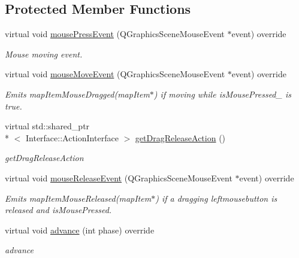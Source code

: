 \subsection*{Protected Member Functions}
\begin{DoxyCompactItemize}
\item 
virtual void \hyperlink{classmap_item_a6525f50a331be9b573c5f41bc7ecad60}{mouse\-Press\-Event} (Q\-Graphics\-Scene\-Mouse\-Event $\ast$event) override
\begin{DoxyCompactList}\small\item\em Mouse moving event. \end{DoxyCompactList}\item 
virtual void \hyperlink{classmap_item_aaa14fe9b384115c559b99086d46860fc}{mouse\-Move\-Event} (Q\-Graphics\-Scene\-Mouse\-Event $\ast$event) override
\begin{DoxyCompactList}\small\item\em Emits map\-Item\-Mouse\-Dragged(map\-Item$\ast$) if moving while is\-Mouse\-Pressed\-\_\- is true. \end{DoxyCompactList}\item 
virtual std\-::shared\-\_\-ptr\\*
$<$ Interface\-::\-Action\-Interface $>$ \hyperlink{classmap_item_ad67b22927103d57c1dc4136eb9115771}{get\-Drag\-Release\-Action} ()
\begin{DoxyCompactList}\small\item\em get\-Drag\-Release\-Action \end{DoxyCompactList}\item 
virtual void \hyperlink{classmap_item_a5a056109cc0e26053c33d4f639c9ce73}{mouse\-Release\-Event} (Q\-Graphics\-Scene\-Mouse\-Event $\ast$event) override
\begin{DoxyCompactList}\small\item\em Emits map\-Item\-Mouse\-Released(map\-Item$\ast$) if a dragging leftmousebutton is released and is\-Mouse\-Pressed. \end{DoxyCompactList}\item 
virtual void \hyperlink{classmap_item_abbeec47258ff3f78b2ffada56c13bb69}{advance} (int phase) override
\begin{DoxyCompactList}\small\item\em advance \end{DoxyCompactList}\end{DoxyCompactItemize}
